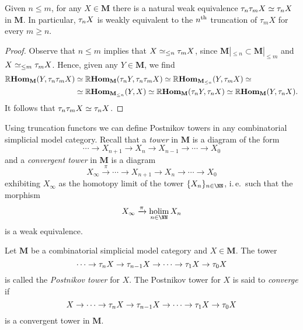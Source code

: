 \begin{corollary}
  Given \(n \leq m\), for any \(X\in\mathbf M\) there is a natural weak equivalence \(\tau_{n}\tau_{m} X \simeq \tau_{n} X\) in \(\mathbf M\). In particular, \(\tau_{n}X\) is weakly equivalent to the \(n\textsuperscript{th}\) truncation of \(\tau_{m}X\) for every \(m\geq n\).
\end{corollary}
\begin{proof}
  Observe that \(n\leq m\) implies that \(X \simeq_{\leq n}\tau_{m}X\), since \(\mathbf M|_{\leq n}\subset \mathbf M|_{\leq m}\) and \(X\simeq_{\leq m}\tau_{m}X\). Hence, given any \(Y\in\mathbf M\), we find
  \begin{align*}
    \operatorname{\mathbb{R}\textnormal{\bfseries Hom}}_{\mathbf M}(Y, \tau_{n}\tau_{m} X)&\simeq \operatorname{\mathbb{R}\textnormal{\bfseries Hom}}_{\mathbf M}(\tau_{n}Y, \tau_{n}\tau_{m}X)\simeq \operatorname{\mathbb{R}\textnormal{\bfseries Hom}}_{\mathbf M_{\leq n}}(Y, \tau_{m}X)\simeq \\
    &\simeq \operatorname{\mathbb{R}\textnormal{\bfseries Hom}}_{\mathbf M_{\leq n}}(Y, X) \simeq \operatorname{\mathbb{R}\textnormal{\bfseries Hom}}_{\mathbf M}(\tau_{n}Y, \tau_{n}X)\simeq \operatorname{\mathbb{R}\textnormal{\bfseries Hom}}_{\mathbf M}(Y, \tau_{n}X).
  \end{align*}
  It follows that \(\tau_{n}\tau_{m}X\simeq \tau_{n}X\).
\end{proof}

Using truncation functors we can define Postnikov towers in any combinatorial simplicial model category. Recall that a \emph{tower} in \(\mathbf M\) is a diagram of the form
\[\cdots \to X_{n+1}\to X_{n}\to X_{n-1}\to \cdots \to X_{0} \]
and a \emph{convergent tower} in \(\mathbf M\) is a diagram
\[X_{\infty}\xrightarrow{\pi} \cdots \to X_{n+1}\to X_{n}\to\cdots\to X_{0}\]
exhibiting \(X_{\infty}\) as the homotopy limit of the tower \(\{X_{n}\}_{n\in\NN}\), i.\,e.~such that the morphism
\[X_{\infty}\xrightarrow{\pi}\holim_{n\in\NN} X_{n}\]
is a weak equivalence.

\begin{definition}
  Let \(\mathbf M\) be a combinatorial simplicial model category and \(X\in\mathbf M\). The tower
  \[\cdots\to\tau_{n} X\to\tau_{n-1} X\to\cdots\to\tau_{1} X\to\tau_{0}X\]
  is called the \emph{Postnikov tower} for \(X\). The Postnikov tower for \(X\) is said to \emph{converge} if
  \[X\to\cdots\to\tau_{n} X\to\tau_{n-1} X\to\cdots\to\tau_{1} X\to\tau_{0}X\]
  is a convergent tower in \(\mathbf M\).
\end{definition}

\printbibliography

\listoftodos

